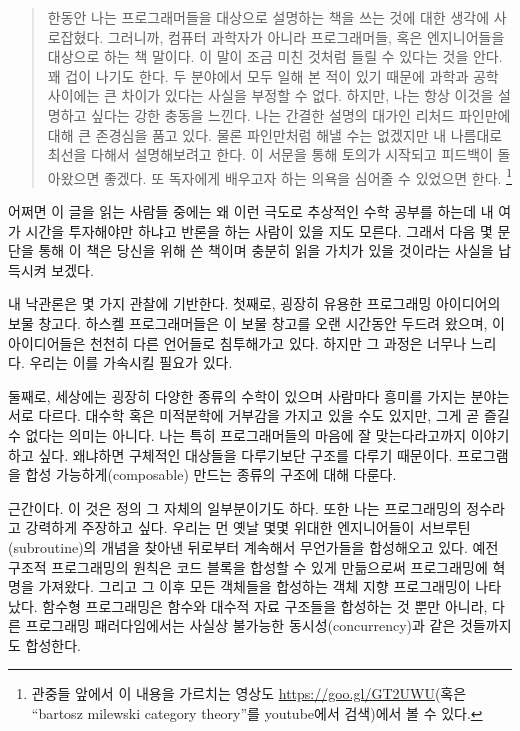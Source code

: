
\begin{quote}
한동안 나는 프로그래머들을 대상으로 \trCategoryTheory\을 설명하는 책을 쓰는 것에 대한 생각에 사로잡혔다. 
그러니까, 컴퓨터 과학자가 아니라 프로그래머들, 혹은 엔지니어들을 대상으로 하는 책 말이다.
이 말이 조금 미친 것처럼 들릴 수 있다는 것을 안다. 꽤 겁이 나기도 한다.
두 분야에서 모두 일해 본 적이 있기 때문에 과학과 공학 사이에는 큰 차이가 있다는 사실을 부정할 수 없다.
하지만, 나는 항상 이것을 설명하고 싶다는 강한 충동을 느낀다. 나는 간결한 설명의 대가인 리처드 파인만에 대해 큰 존경심을 품고 있다.
물론 파인만처럼 해낼 수는 없겠지만 내 나름대로 최선을 다해서 설명해보려고 한다.
이 서문을 통해 토의가 시작되고 피드백이 돌아왔으면 좋겠다.
또 독자에게 \trCategoryTheory\을 배우고자 하는 의욕을 심어줄 수 있었으면 한다.
\footnote{
관중들 앞에서 이 내용을 가르치는 영상도 \href{https://goo.gl/GT2UWU}{https://goo.gl/GT2UWU}(혹은 ``bartosz milewski category theory''를 youtube에서 검색)에서 볼 수 있다.}
\end{quote}

어쩌면 이 글을 읽는 사람들 중에는 왜 이런 극도로 추상적인 수학 공부를 하는데 내 여가 시간을 투자해야만 하냐고 반론을 하는 사람이 있을 지도 모른다.
그래서 다음 몇 문단을 통해 이 책은 당신을 위해 쓴 책이며 충분히 읽을 가치가 있을 것이라는 사실을 납득시켜 보겠다.

내 낙관론은 몇 가지 관찰에 기반한다. 첫째로, \trCategoryTheory\는 굉장히 유용한 프로그래밍 아이디어의 보물 창고다.
하스켈 프로그래머들은 이 보물 창고를 오랜 시간동안 두드려 왔으며, 이 아이디어들은 천천히 다른 언어들로 침투해가고 있다.
하지만 그 과정은 너무나 느리다. 우리는 이를 가속시킬 필요가 있다.

둘째로, 세상에는 굉장히 다양한 종류의 수학이 있으며 사람마다 흥미를 가지는 분야는 서로 다르다.
대수학 혹은 미적분학에 거부감을 가지고 있을 수도 있지만, 그게 곧 \trCategoryTheory\를 즐길 수 없다는 의미는 아니다.
나는 \trCategoryTheory\는 특히 프로그래머들의 마음에 잘 맞는다라고까지 이야기하고 싶다. 왜냐하면 \trCategoryTheory\는 구체적인 대상들을 다루기보단 구조를 다루기 때문이다.
\trCategoryTheory\는 프로그램을 합성 가능하게(composable) 만드는 종류의 구조에 대해 다룬다.

\trComposition\은  근간이다. 이 것은  정의 그 자체의 일부분이기도 하다.
또한 나는  프로그래밍의 정수라고 강력하게 주장하고 싶다.
우리는 먼 옛날 몇몇 위대한 엔지니어들이 서브루틴(subroutine)의 개념을 찾아낸 뒤로부터 계속해서 무언가들을 합성해오고 있다.
예전 구조적 프로그래밍의 원칙은 코드 블록을 합성할 수 있게 만듦으로써 프로그래밍에 혁명을 가져왔다.
그리고 그 이후 모든 객체들을 합성하는 객체 지향 프로그래밍이 나타났다.
함수형 프로그래밍은 함수와 대수적 자료 구조들을 합성하는 것 뿐만 아니라, 다른 프로그래밍 패러다임에서는 사실상 불가능한 동시성(concurrency)과 같은 것들까지도 합성한다.

